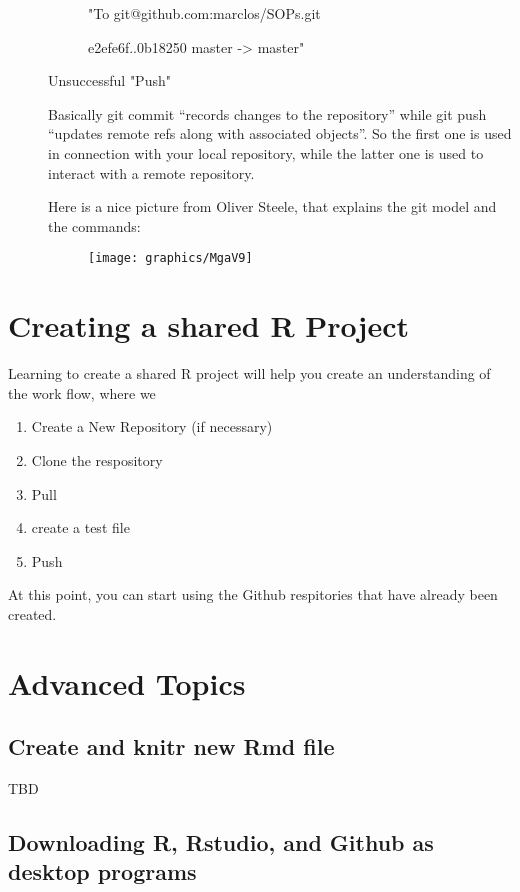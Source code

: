 \documentclass[12pt]{../SOP4_alpha}\usepackage[]{graphicx}\usepackage[]{xcolor}
\begin{document}
\begin{description}
\begin{description}
    "To git@github.com:marclos/SOPs.git
  
   e2efe6f..0b18250  master -> master"
   \item[Unsuccessful "Push"]
\end{description}
  
  
Basically git commit ``records changes to the repository'' while git push ``updates remote refs along with associated objects''. So the first one is used in connection with your local repository, while the latter one is used to interact with a remote repository.

Here is a nice picture from Oliver Steele, that explains the git model and the commands:  

\begin{figure}
\centering
\texttt{[image: graphics/MgaV9]}
\end{figure}
   
\end{description}

\section{Creating a shared R Project}

\NP Learning to create a shared R project will help you create an understanding of the work flow, where we 

\begin{enumerate}
\item Create a New Repository (if necessary)
\item Clone the respository
\item Pull 
\item create a test file
\item Push
\end{enumerate}

\NP At this point, you can start using the Github respitories that have already been created.


\section{Advanced Topics}

\subsection{Create and knitr new Rmd file}

TBD

\subsection{Downloading R, Rstudio, and Github as desktop programs}
\end{document}
